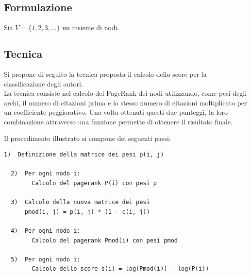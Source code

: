 \documentclass[a4paper,12pt]{article}
\begin{document}
\subsection{Formulazione}
Sia $ V = \{ 1, 2, 3, \ldots \} $ un insieme di nodi.

\subsection{Tecnica}
Si propone di seguito la tecnica proposta il calcolo dello score per la classificazione degli autori. \\
La tecnica consiste nel calcolo del PageRank dei nodi utilizzando, come pesi degli archi, il numero di citazioni prima e lo stesso numero di citazioni moltiplicato per un coefficiente peggiorativo. Una volta ottenuti questi due punteggi, la loro combinazione attraverso una funzione permette di ottenere il risultato finale.
\par
Il procedimento illustrato si compone dei seguenti passi:
\begin{lstlisting}[keepspaces=true]
  1)  Definizione della matrice dei pesi p(i, j)
  
  2)  Per ogni nodo i:
        Calcolo del pagerank P(i) con pesi p 

  3)  Calcolo della nuova matrice dei pesi 
      pmod(i, j) = p(i, j) * (1 - c(i, j))
      
  4)  Per ogni nodo i:
        Calcolo del pagerank Pmod(i) con pesi pmod
        
  5)  Per ogni nodo i:
        Calcolo dello score s(i) = log(Pmod(i)) - log(P(i))
\end{lstlisting}
\end{document}
